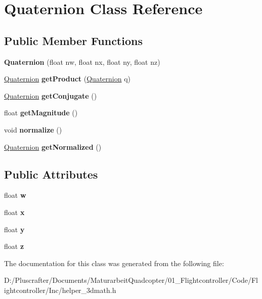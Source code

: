 \hypertarget{class_quaternion}{}\section{Quaternion Class Reference}
\label{class_quaternion}
\subsection*{Public Member Functions}
\begin{DoxyCompactItemize}
\item 
\mbox{\label{class_quaternion_ad8158a59767dc3d42ebf0324b82ba95a}} 
{\bfseries Quaternion} (float nw, float nx, float ny, float nz)
\item 
\mbox{\label{class_quaternion_a3ff8405ed92a3ca16de656e6c83b4028}} 
\mbox{\hyperlink{class_quaternion}{Quaternion}} {\bfseries get\+Product} (\mbox{\hyperlink{class_quaternion}{Quaternion}} q)
\item 
\mbox{\label{class_quaternion_a079a5673188a8a7d608e8495de0dd119}} 
\mbox{\hyperlink{class_quaternion}{Quaternion}} {\bfseries get\+Conjugate} ()
\item 
\mbox{\label{class_quaternion_a6d0f82bd29fcbe29f784e848ec2eb8f1}} 
float {\bfseries get\+Magnitude} ()
\item 
\mbox{\label{class_quaternion_a48e6bafb249c895ed25f29dc9170e11e}} 
void {\bfseries normalize} ()
\item 
\mbox{\label{class_quaternion_a61f5f7cb9b248aa259292c3c1960a1f0}} 
\mbox{\hyperlink{class_quaternion}{Quaternion}} {\bfseries get\+Normalized} ()
\end{DoxyCompactItemize}
\subsection*{Public Attributes}
\begin{DoxyCompactItemize}
\item 
\mbox{\label{class_quaternion_aa44a65ab99e36f6ab8771030eed8a7ad}} 
float {\bfseries w}
\item 
\mbox{\label{class_quaternion_a8b80f191a3155cc0158d2b4f4d50b2cb}} 
float {\bfseries x}
\item 
\mbox{\label{class_quaternion_a3bd3f270462944423611f44e19d2511b}} 
float {\bfseries y}
\item 
\mbox{\label{class_quaternion_a625cb732d8ff3083e7852b86b736ab29}} 
float {\bfseries z}
\end{DoxyCompactItemize}


The documentation for this class was generated from the following file\+:\begin{DoxyCompactItemize}
\item 
D\+:/\+Pluscrafter/\+Documents/\+Maturarbeit\+Quadcopter/01\+\_\+\+Flightcontroller/\+Code/\+Flightcontroller/\+Inc/helper\+\_\+3dmath.\+h\end{DoxyCompactItemize}
